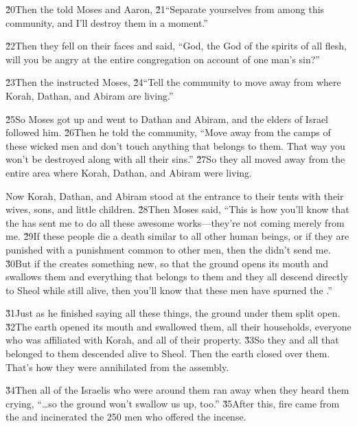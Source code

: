 \v{20}Then the  told Moses and Aaron, \v{21}``Separate yourselves from among this community, and I'll destroy them in a moment.''

\v{22}Then they fell on their faces and said, ``God, the God of the spirits of all flesh, will you be angry at the entire congregation on account of one man's sin?''

\v{23}Then the  instructed Moses, \v{24}``Tell the community to move away from where Korah, Dathan, and Abiram are living.''

\v{25}So Moses got up and went to Dathan and Abiram, and the elders of Israel followed him. \v{26}Then he told the community, ``Move away from the camps of these wicked men and don't touch anything that belongs to them. That way you won't be destroyed along with all their sins.'' \v{27}So they all moved away from the entire area where Korah, Dathan, and Abiram were living.

Now Korah, Dathan, and Abiram stood at the entrance to their tents with their wives, sons, and little children. \v{28}Then Moses said, ``This is how you'll know that the  has sent me to do all these awesome works---they're not coming merely from me. \v{29}If these people die a death similar to all other human beings, or if they are punished with a punishment common to other men, then the  didn't send me. \v{30}But if the  creates something new, so that the ground opens its mouth and swallows them and everything that belongs to them and they all descend directly to Sheol while still alive, then you'll know that these men have spurned the .''

\v{31}Just as he finished saying all these things, the ground under them split open. \v{32}The earth opened its mouth and swallowed them, all their households, everyone who was affiliated with Korah, and all of their property. \v{33}So they and all that belonged to them descended alive to Sheol. Then the earth closed over them. That's how they were annihilated from the assembly.

\v{34}Then all of the Israelis who were around them ran away when they heard them crying, ``{\ldots}so the ground won't swallow us up, too.'' \v{35}After this, fire came from the  and incinerated the 250 men who offered the incense.

